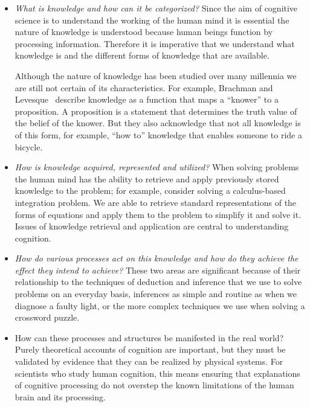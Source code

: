 \begin{itemize}
\item \emph{What is knowledge and how can it be categorized?}  Since the aim
  of cognitive science is to understand the working of the human mind
  it is essential the nature of knowledge is understood because human
  beings function by processing information. Therefore it is
  imperative that we understand what knowledge is and the different
  forms of knowledge that are available.

  Although the nature of knowledge has been studied over many
  millennia we are still not certain of its characteristics.  For
  example, Brachman and Levesque~\cite{brachman-levesque:2004a}
  describe knowledge as a function that maps a ``knower'' to a
  proposition. A proposition is a statement that determines the truth
  value of the belief of the knower. But they also acknowledge that
  not all knowledge is of this form, for example, ``how to'' knowledge
  that enables someone to ride a bicycle.

\item \emph{How is knowledge acquired, represented and utilized?} When
  solving problems the human mind has the ability to retrieve and
  apply previously stored knowledge to the problem; for example,
  consider solving a calculus-based integration problem.  We are able
  to retrieve standard representations of the forms of equations and
  apply them to the problem to simplify it and solve it.  Issues of
  knowledge retrieval and application are central to understanding
  cognition.

\item {\em How do various processes act on this knowledge and how do
    they achieve the effect they intend to achieve?}  These two areas
  are significant because of their relationship to the techniques of
  deduction and inference that we use to solve problems on an everyday
  basis, inferences as simple and routine as when we diagnose a faulty
  light, or the more complex techniques we use when solving a
  crossword puzzle.

\item How can these processes and structures be manifested in the real
  world?  Purely theoretical accounts of cognition are important, but
  they must be validated by evidence that they can be realized by
  physical systems.  For scientists who study human cognition, this
  means ensuring that explanations of cognitive processing do not
  overstep the known limitations of the human brain and its
  processing.
\end{itemize}

